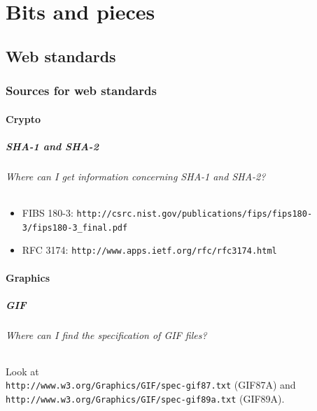 \documentclass[10pt]{scrbook}
\begin{document}
\part{Bits and pieces}

\chapter{Web standards}

\section{Sources for web standards}

\subsection{Crypto}

\subsubsection{SHA-1 and SHA-2}

\paragraph{Where can I get information concerning SHA-1 and SHA-2?}
\begin{itemize}
\item FIBS 180-3: \verb|http://csrc.nist.gov/publications/fips/fips180-3/fips180-3_final.pdf|
\item RFC 3174: \verb|http://www.apps.ietf.org/rfc/rfc3174.html|
\end{itemize}

\subsection{Graphics}

\subsubsection{GIF}

\paragraph{Where can I find the specification of GIF files?}
Look at \\
\verb|http://www.w3.org/Graphics/GIF/spec-gif87.txt| (GIF87A) and \\
\verb|http://www.w3.org/Graphics/GIF/spec-gif89a.txt| (GIF89A).
\end{document}
